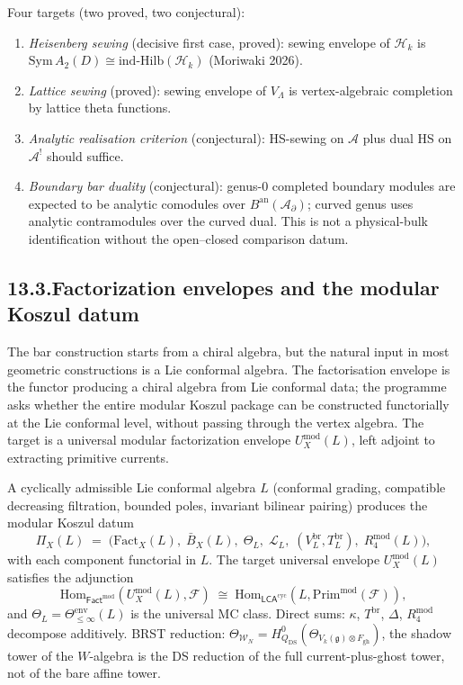 \documentclass[11pt,reqno]{amsart}
\theoremstyle{definition}
\theoremstyle{remark}
\providecommand{\cA}{\mathcal{A}}
\providecommand{\cF}{\mathcal{F}}
\providecommand{\cH}{\mathcal{H}}
\providecommand{\cL}{\mathcal{L}}
\providecommand{\cW}{\mathcal{W}}
\providecommand{\Sym}{\mathrm{Sym}}
\providecommand{\Hom}{\mathrm{Hom}}
\providecommand{\fg}{\mathfrak{g}}
\providecommand{\DS}{\mathrm{DS}}
\providecommand{\cyc}{\mathrm{cyc}}
\renewcommand{\mod}{\mathrm{mod}}
\providecommand{\gh}{\mathrm{gh}}
\numberwithin{equation}{section}
\begin{document}
Four targets (two proved, two conjectural):
\begin{enumerate}[label=(\alph*),nosep]
\item \emph{Heisenberg sewing} (decisive first case, proved):
sewing envelope of $\cH_k$ is
$\Sym\,A_2(D) \cong \mathrm{ind\text{-}Hilb}(\cH_k)$
(Moriwaki 2026).
\item \emph{Lattice sewing} (proved): sewing envelope of
$V_\Lambda$ is vertex-algebraic completion by lattice theta
functions.
\item \emph{Analytic realisation criterion} (conjectural):
HS-sewing on $\cA$ plus dual HS on $\cA^!$ should suffice.
\item \emph{Boundary bar duality} (conjectural): genus-$0$
completed boundary modules are expected to be analytic comodules
over $B^{\mathrm{an}}(\cA_\partial)$; curved genus uses analytic
contramodules over the curved dual. This is not a physical-bulk
identification without the open--closed comparison datum.
\end{enumerate}

\subsection*{13.3.\enspace Factorization envelopes and the modular Koszul datum}

The bar construction starts from a chiral algebra, but the
natural input in most geometric constructions is a Lie conformal
algebra. The factorisation envelope is the functor producing a
chiral algebra from Lie conformal data; the programme asks
whether the entire modular Koszul package can be constructed
functorially at the Lie conformal level, without passing
through the vertex algebra. The target is a universal modular
factorization envelope $U^{\mod}_X(L)$, left adjoint to
extracting primitive currents.

A cyclically admissible Lie conformal algebra $L$ (conformal
grading, compatible decreasing filtration, bounded poles,
invariant bilinear pairing) produces the modular Koszul datum
\[
\Pi_X(L)
\;=\;
\bigl(
\mathrm{Fact}_X(L),\;
\bar B_X(L),\;
\Theta_L,\;
\cL_L,\;
(V^{\mathrm{br}}_L, T^{\mathrm{br}}_L),\;
R_4^{\mod}(L)
\bigr),
\]
with each component functorial in $L$. The target universal
envelope $U^{\mod}_X(L)$ satisfies the adjunction
\[
\Hom_{\mathsf{Fact}^{\mod}}(U^{\mod}_X(L), \cF)
\;\cong\;
\Hom_{\mathsf{LCA}^{\cyc}}(L, \mathrm{Prim}^{\mod}(\cF)),
\]
and $\Theta_L = \Theta^{\mathrm{env}}_{\le\infty}(L)$ is the
universal MC class. Direct sums: $\kappa$, $T^{\mathrm{br}}$,
$\Delta$, $R_4^{\mod}$ decompose additively. BRST reduction:
$\Theta_{\cW_N} = H^0_{Q_{\DS}}(\Theta_{V_k(\fg)\otimes F_{\gh}})$,
the shadow tower of the $W$-algebra is the DS reduction of
the full current-plus-ghost tower, not of the bare affine tower.
\end{document}
